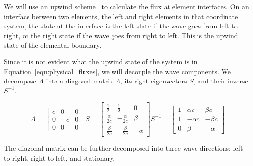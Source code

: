 We will use an upwind scheme~\cite{Toro2009} to calculate the flux at element interfaces. On an
interface between two elements, the left and right elements in that coordinate system, the state at
the interface is the left state if the wave goes from left to right, or the right state if the wave
goes from right to left. This is the upwind state of the elemental boundary.

Since it is not evident what the upwind state of the system is in
Equation~\ref{equ:physical_fluxes}, we will decouple the wave components. We decompose \(A\) into a
diagonal matrix \(\Lambda \), its right eigenvectors \(S\), and their inverse \(S^{-1}\).

\begin{equation}
    \Lambda = 
    \begin{bmatrix}
        c & 0 & 0 \\ 
        0 & -c & 0 \\ 
        0 & 0 & 0
    \end{bmatrix}
    S = 
    \begin{bmatrix}
        \frac{1}{2} & \frac{1}{2} & 0 \\ 
        \frac{\alpha}{2 c} & -\frac{\alpha}{2 c} & \beta \\ 
        \frac{\beta}{2 c} & -\frac{\beta}{2 c} & -\alpha 
    \end{bmatrix}
    S^{-1} = 
    \begin{bmatrix}
        1 & \alpha c & \beta c \\ 
        1 & -\alpha c & -\beta c \\ 
        0 & \beta & -\alpha
    \end{bmatrix}
\end{equation}

The diagonal matrix can be further decomposed into three wave directions: left-to-right,
right-to-left, and stationary.

